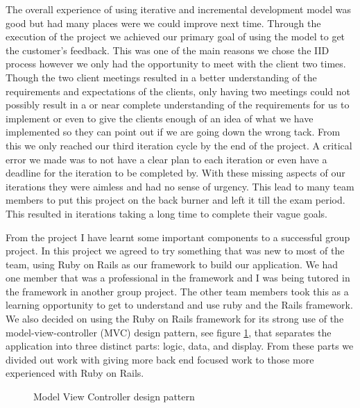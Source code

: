\documentclass{style/CRPITStyle}
\begin{document}
The overall experience of using iterative and incremental development model was
good but had many places were we could improve next time. Through the
execution of the project we achieved our primary goal of using the model to get
the customer's feedback. This was one of the main reasons we chose the IID
process however we only had the opportunity to meet with the client two times.
Though the two client meetings resulted in a better understanding of the
requirements and expectations of the clients, only having two meetings
could not possibly result in a or near complete understanding of the
requirements for us to implement or even to give the clients enough of an idea of
what we have implemented so they can point out if we are going down the wrong
tack.
From this we only reached our third iteration cycle by the end of the project.
A critical error we made was to not have a clear plan to each iteration or even
have a deadline for the iteration to be completed by. With these missing aspects
of our iterations they were aimless and had no sense of urgency. This lead to
many team members to put this project on the back burner and left it till the
exam period. This resulted in iterations taking a long time to complete their
vague goals.

\vspace{.1in}

From the project I have learnt some important components to a successful group
project. In this project we agreed to try something that was new to most of the
team, using Ruby on Rails as our framework to build our application. We had one
member that was a professional in the framework and I was being tutored in the
framework in another group project. The other team members took this as a
learning opportunity to get to understand and use ruby and the Rails framework.
We also decided on using the Ruby on Rails framework for its strong use of the
model-view-controller (MVC) design pattern, see figure \ref{mvc-pattern}, that
separates the application into three distinct parts: logic, data, and display.
From these parts we divided out work with giving more back end focused work to
those more experienced with Ruby on Rails.

\vspace{.1in}

\begin{figure}[htb]
\caption{\protect\label{mvc-pattern} Model View Controller design pattern }
\end{figure}
\end{document}
